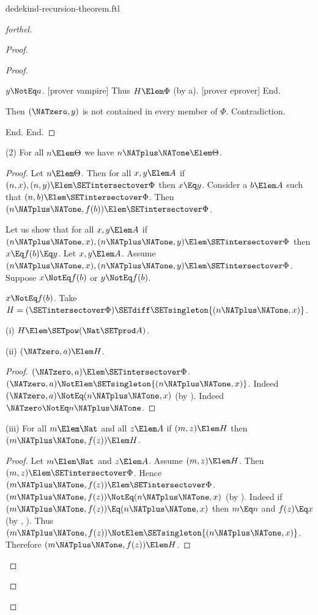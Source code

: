 \documentclass{stex}
\begin{document}
\begin{smodule}{dedekind-recursion-theorem.ftl}
\begin{proof}[forthel]
\begin{proof}
\begin{proof}
\begin{case}{$y \NotEq a$.}
              [prover vampire]
              Thus $H \Elem \Phi$ (by a).
              [prover eprover]
            End.

            Then $(\NATzero,y)$ is not contained in every member of $\Phi$.
            Contradiction.
          \end{case}
        End.
      End.
    \end{proof}

    (2) For all $n \Elem \Theta$ we have $n \NATplus \NATone \Elem \Theta$.
    \begin{proof}
      Let $n \Elem \Theta$.
      Then for all $x, y \Elem A$ if $(n, x), (n, y) \Elem \SETintersectover \Phi$ then
      $x \Eq y$.
      Consider a $b \Elem A$ such that $(n,b) \Elem \SETintersectover \Phi$.
      Then $(n \NATplus \NATone, f(b)) \Elem \SETintersectover \Phi$.

      Let us show that for all $x, y \Elem A$ if $(n \NATplus \NATone, x),
      (n \NATplus \NATone, y) \Elem \SETintersectover \Phi$ then $x \Eq f(b) \Eq y$.
        Let $x, y \Elem A$.
        Assume $(n \NATplus \NATone, x), (n \NATplus \NATone, y) \Elem \SETintersectover \Phi$.
        Suppose $x \NotEq f(b)$ or $y \NotEq f(b)$.

        \begin{case}{$x \NotEq f(b)$.}
          Take $H = (\SETintersectover \Phi) \SETdiff \SETsingleton{(n \NATplus \NATone,x)}$.

          (i) $H \Elem \SETpow(\Nat \SETprod A)$.

          (ii) $(\NATzero,a) \Elem H$.
          \begin{proof}
            $(\NATzero,a) \Elem \SETintersectover \Phi$.
            $(\NATzero,a) \NotElem \SETsingleton{(n \NATplus \NATone,x)}$.
            Indeed $(\NATzero,a) \NotEq (n \NATplus \NATone,x)$ (by ).
            Indeed $\NATzero \NotEq n \NATplus \NATone$.
          \end{proof}

          (iii) For all $m \Elem \Nat$ and all $z \Elem A$ if $(m,z) \Elem H$ then $(m \NATplus \NATone,f(z)) \Elem H$.
          \begin{proof}
            Let $m \Elem \Nat$ and $z \Elem A$.
            Assume $(m,z) \Elem H$.
            Then $(m,z) \Elem \SETintersectover \Phi$.
            Hence $(m \NATplus \NATone,f(z)) \Elem \SETintersectover \Phi$.
            $(m \NATplus \NATone,f(z)) \NotEq (n \NATplus \NATone,x)$ (by ).
            Indeed if $(m \NATplus \NATone,f(z)) \Eq (n \NATplus \NATone,x)$ then $m \Eq n$ and $f(z) \Eq x$ (by , ).
            Thus $(m \NATplus \NATone,f(z)) \NotElem \SETsingleton{(n \NATplus \NATone,x)}$.
            Therefore $(m \NATplus \NATone,f(z)) \Elem H$.
          \end{proof}


\end{case}
\end{proof}
\end{proof}
\end{proof}
\end{smodule}
\end{document}

